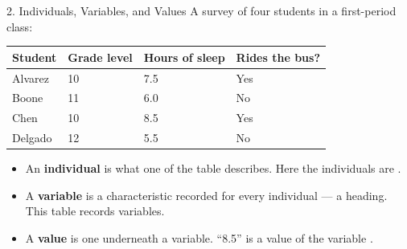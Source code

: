 \documentclass[10pt]{article}
\begin{document}
\boxguard[24]
\begin{notesbox}{2. Individuals, Variables, and Values}
\small
A survey of four students in a first-period class:

\vspace{5pt}
\renewcommand{\arraystretch}{1.25}
\begin{tabularx}{\linewidth}{@{} l Y Y Y @{}}
\textbf{Student} & \textbf{Grade level} & \textbf{Hours of sleep} & \textbf{Rides the bus?} \\
\hline
Alvarez & 10 & 7.5 & Yes \\
Boone   & 11 & 6.0 & No  \\
Chen    & 10 & 8.5 & Yes \\
Delgado & 12 & 5.5 & No  \\
\hline
\end{tabularx}

\vspace{8pt}
\begin{itemize}[leftmargin=1.3em, itemsep=6pt]
  \item An \textbf{individual} is what one \blank{2.0cm} of the table describes. Here the
        individuals are \blank{4.4cm}.
  \item A \textbf{variable} is a characteristic recorded for every individual --- a
        \blank{3.0cm} heading. This table records \blank{1.0cm} variables.
  \item A \textbf{value} is one \blank{2.0cm} underneath a variable. ``8.5'' is a value
        of the variable \blank{3.2cm}.
\end{itemize}

\vspace{6pt}
\begin{center}
\end{center}
\end{notesbox}

\vspace{0.10in}
\end{document}
